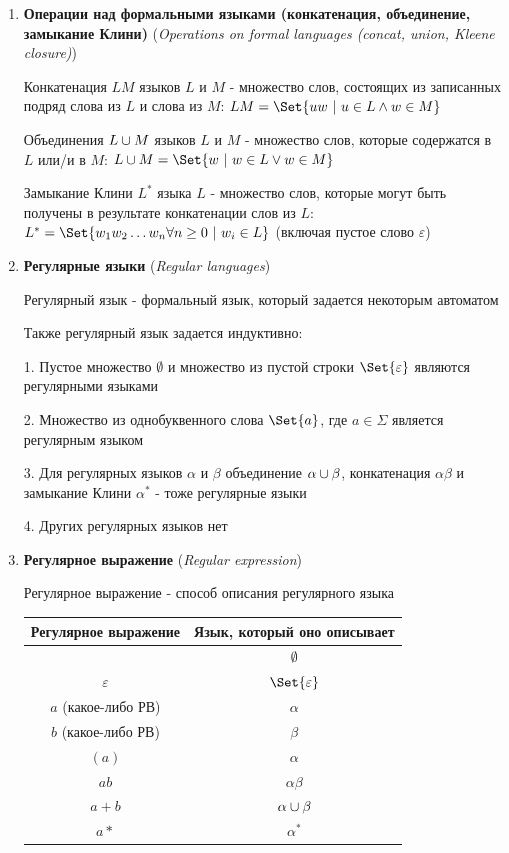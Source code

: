 \documentclass[12pt]{article}
\begin{document}
\begin{enumerate}
        \item \textbf{Операции над формальными языками (конкатенация, объединение, замыкание Клини)} (\textit{Operations on formal languages (concat, union, Kleene closure)})

        Конкатенация $LM$ языков $L$ и $M$ - множество слов, состоящих из записанных подряд слова из $L$ и слова из $M$: $LM = \Set{uw \ | \ u \in L \land w \in M}$

        Объединения $L \cup M$ языков $L$ и $M$ - множество слов, которые содержатся в $L$ или/и в $M$: $L \union M = \Set{w \ | \ w \in L \lor w \in M}$

        Замыкание Клини $L^*$ языка $L$ - множество слов, которые могут быть получены в результате конкатенации слов из $L$: $L^* = \Set{w_1 w_2 \dots w_n \forall n \geq 0 \ | \ w_i \in L}$ (включая пустое слово $\varepsilon$)

        \item \textbf{Регулярные языки} (\textit{Regular languages})

        Регулярный язык - формальный язык, который задается некоторым автоматом

        Также регулярный язык задается индуктивно:

        1. Пустое множество $\emptyset$ и множество из пустой строки $\Set{\varepsilon}$ являются регулярными языками

        2. Множество из однобуквенного слова $\Set{a}$, где $a \in \Sigma$ является регулярным языком

        3. Для регулярных языков $\alpha$ и $\beta$ объединение $\alpha \cup \beta$, конкатенация $\alpha\beta$ и замыкание Клини $\alpha^*$ - тоже регулярные языки

        4. Других регулярных языков нет

        \item \textbf{Регулярное выражение} (\textit{Regular expression})

        Регулярное выражение - способ описания регулярного языка

        \begin{tabular}{c|c}
            Регулярное выражение & Язык, который оно описывает \\
            \hline
            & $\emptyset$                 \\
            $\varepsilon$        & $\Set{\varepsilon}$         \\
            $a$ (какое-либо РВ)  & $\alpha$                    \\
            $b$ (какое-либо РВ)  & $\beta$                     \\
            $(a)$                & $\alpha$                    \\
            $ab$                 & $\alpha\beta$               \\
            $a + b$              & $\alpha \cup \beta$       \\
            $a*$                 & $\alpha^*$                  \\


\end{tabular}
\end{enumerate}
\end{document}
